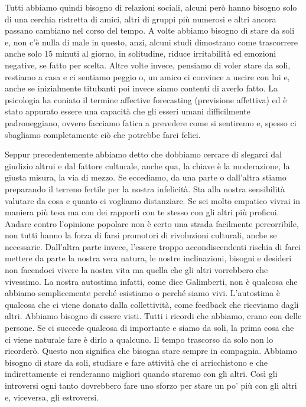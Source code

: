 \documentclass[12pt]{book} %
\begin{document}
\bigskip

Tutti abbiamo quindi bisogno di relazioni sociali, alcuni però hanno bisogno solo di una cerchia ristretta di amici,
altri di gruppi più numerosi e altri ancora passano cambiano nel corso del tempo. A volte abbiamo bisogno di stare da
soli e, non c'è nulla di male in questo, anzi, alcuni studi dimostrano come trascorrere anche solo
15 minuti al giorno, in solitudine, riduce irritabilità ed emozioni negative, se fatto per scelta. Altre volte invece,
pensiamo di voler stare da soli, restiamo a casa e ci sentiamo peggio o, un amico ci convince a uscire con lui e, anche
se inizialmente titubanti poi invece siamo contenti di averlo fatto. La psicologia ha coniato il termine affective
forecasting (previsione affettiva) ed è stato appurato essere una capacità che gli esseri umani difficilmente
padroneggiano, ovvero facciamo fatica a prevedere come si sentiremo e, spesso ci sbagliamo completamente ciò che
potrebbe farci felici.


\bigskip

Seppur precedentemente abbiamo detto che dobbiamo cercare di slegarci dal giudizio altrui e dal fattore culturale, anche
qua, la chiave è la moderazione, la giusta misura, la via di mezzo. Se eccediamo, da una parte o
dall'altra stiamo preparando il terreno fertile per la nostra infelicità. Sta alla nostra
sensibilità valutare da cosa e quanto ci vogliamo distanziare. Se sei molto empatico vivrai in maniera più tesa ma con
dei rapporti con te stesso con gli altri più proficui. Andare contro l'opinione popolare non è
certo una strada facilmente percorribile, non tutti hanno la forza di farsi promotori di rivoluzioni culturali, anche
se necessarie. Dall'altra parte invece, l'essere troppo accondiscendenti
rischia di farci mettere da parte la nostra vera natura, le nostre inclinazioni, bisogni e desideri non facendoci
vivere la nostra vita ma quella che gli altri vorrebbero che vivessimo. La nostra autostima infatti, come dice
Galimberti, non è qualcosa che abbiamo semplicemente perché esistiamo o perché siamo vivi.
L'autostima è qualcosa che ci viene donato dalla collettività, come feedback che riceviamo dagli
altri. Abbiamo bisogno di essere visti.
Tutti i ricordi che abbiamo, erano con delle persone. Se ci succede qualcosa di importante e siamo da soli, la prima cosa che ci viene naturale fare è dirlo a qualcuno. Il tempo trascorso da solo non lo ricorderò. Questo non significa che bisogna stare sempre in compagnia. Abbiamo bisogno di stare da soli, studiare e fare attività che ci arricchistono e che indirettamente ci renderanno migliori quando staremo con gli altri. Così gli introversi ogni tanto dovrebbero fare uno sforzo per stare  un po' più con gli altri e, viceversa, gli estroversi.
\end{document}
